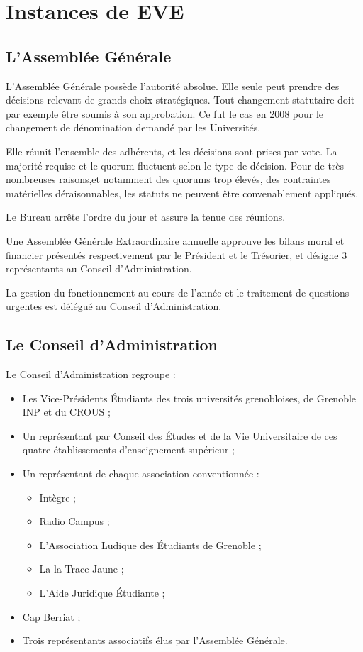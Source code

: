 \section{Instances de EVE}

\label{parcoursstruct}

\subsection{L'Assemblée Générale}

L'Assemblée Générale possède l'autorité absolue. Elle seule peut prendre des
décisions relevant de grands choix stratégiques. Tout changement statutaire
doit par exemple être soumis à son approbation. Ce fut le cas en 2008 pour le
changement de dénomination demandé par les Universités.

Elle réunit l'ensemble des adhérents,
et les décisions sont prises par vote.
La majorité requise et le quorum fluctuent selon le type de décision.
Pour de très nombreuses raisons,et notamment des quorums trop élevés,
des contraintes matérielles déraisonnables, les statuts ne peuvent être
convenablement appliqués.

Le Bureau arrête l'ordre du jour et assure la tenue des réunions.

Une Assemblée Générale Extraordinaire annuelle approuve les bilans moral et
financier présentés respectivement par le Président et le Trésorier,
et désigne 3 représentants au Conseil d'Administration.

La gestion du fonctionnement au cours de l'année et le traitement de questions
urgentes est délégué au Conseil d'Administration.

\subsection{Le Conseil d'Administration}
\label{ca}

Le Conseil d'Administration regroupe :

\begin{itemize}
\item Les Vice-Présidents Étudiants des trois universités grenobloises, de Grenoble INP et du CROUS ;
\item Un représentant par Conseil des Études et de la Vie Universitaire de ces quatre établissements d'enseignement supérieur ;
\item Un représentant de chaque association conventionnée :
	\begin{itemize}
	\item Intègre ;
	\item Radio Campus ;
	\item L'Association Ludique des Étudiants de Grenoble ;
	\item La la Trace Jaune ;
	\item L'Aide Juridique Étudiante ;
	\end{itemize}
\item Cap Berriat ;
\item Trois représentants associatifs élus par l'Assemblée Générale.
\end{itemize}

